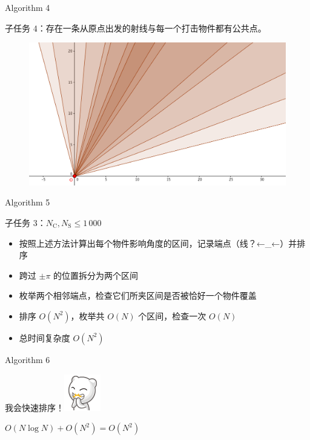 \documentclass[UTF8]{beamer}
\begin{document}
\begin{frame}{Algorithm 4}

子任务 4：存在一条从原点出发的射线与每一个打击物件都有公共点。

\begin{figure}[h]\centering
\includegraphics[scale=0.4]{a4.png}
\end{figure}



\end{frame}

\begin{frame}{Algorithm 5}

子任务 3：$N_\mathrm{C}, N_\mathrm{S} \leq 1\,000$ \newline

\begin{itemize}
    \pause \item 按照上述方法计算出每个物件影响角度的区间，记录端点（线？←\_←）并排序
    \pause \item 跨过 $\pm \pi$ 的位置拆分为两个区间
    \pause \item 枚举两个相邻端点，检查它们所夹区间是否被恰好一个物件覆盖
    \pause \item 排序 $O(N^2)$，枚举共 $O(N)$ 个区间，检查一次 $O(N)$
    \item 总时间复杂度 $O(N^2)$
\end{itemize}

\end{frame}

\begin{frame}{Algorithm 6}

我会快速排序！\includegraphics[scale=0.666]{yy.png} \newline\newline

\pause $O(N \log N) + O(N^2) = O(N^2)$

\end{frame}
\end{document}
